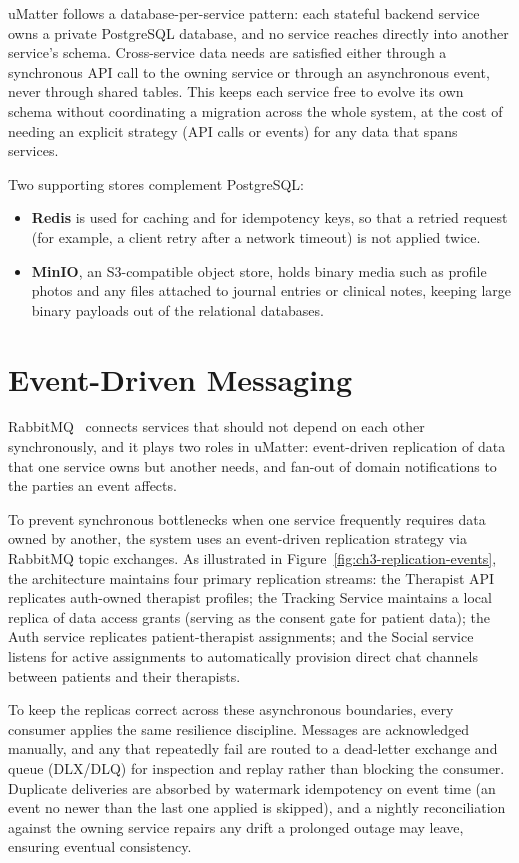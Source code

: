 uMatter follows a database-per-service pattern: each stateful backend service owns a private PostgreSQL database, and no service reaches directly into another service's schema. Cross-service data needs are satisfied either through a synchronous API call to the owning service or through an asynchronous event, never through shared tables. This keeps each service free to evolve its own schema without coordinating a migration across the whole system, at the cost of needing an explicit strategy (API calls or events) for any data that spans services.

Two supporting stores complement PostgreSQL:

\begin{itemize}
\item \textbf{Redis} is used for caching and for idempotency keys, so that a retried request (for example, a client retry after a network timeout) is not applied twice.
\item \textbf{MinIO}, an S3-compatible object store, holds binary media such as profile photos and any files attached to journal entries or clinical notes, keeping large binary payloads out of the relational databases.
\end{itemize}

\section{Event-Driven Messaging}
\label{sec:events}

RabbitMQ~\cite{RabbitMQ} connects services that should not depend on each other synchronously, and it plays two roles in uMatter: event-driven replication of data that one service owns but another needs, and fan-out of domain notifications to the parties an event affects.

To prevent synchronous bottlenecks when one service frequently requires data owned by another, the system uses an event-driven replication strategy via RabbitMQ topic exchanges. As illustrated in Figure~\ref{fig:ch3-replication-events}, the architecture maintains four primary replication streams: the Therapist API replicates auth-owned therapist profiles; the Tracking Service maintains a local replica of data access grants (serving as the consent gate for patient data); the Auth service replicates patient-therapist assignments; and the Social service listens for active assignments to automatically provision direct chat channels between patients and their therapists.

To keep the replicas correct across these asynchronous boundaries, every consumer applies the same resilience discipline. Messages are acknowledged manually, and any that repeatedly fail are routed to a dead-letter exchange and queue (DLX/DLQ) for inspection and replay rather than blocking the consumer. Duplicate deliveries are absorbed by watermark idempotency on event time (an event no newer than the last one applied is skipped), and a nightly reconciliation against the owning service repairs any drift a prolonged outage may leave, ensuring eventual consistency.

